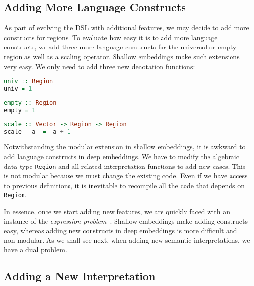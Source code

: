 \subsection{Adding More Language Constructs}

As part of evolving the DSL with additional features, we may decide to add more
constructs for regions. To evaluate how easy it is to add more language constructs,
we add three more
language constructs for the universal or empty region as well as a scaling
operator. Shallow embeddings make such extensions very easy. We only need
to add three new denotation functions:

\noindent
\begin{minipage}{0.25\textwidth}
\begin{lstlisting}[language=Haskell]
univ :: Region
univ = 1
\end{lstlisting}
\end{minipage}%
\begin{minipage}{0.25\textwidth}
\begin{lstlisting}[language=Haskell]
empty :: Region
empty = 1
\end{lstlisting}
\end{minipage}%
\begin{minipage}{0.5\textwidth}
\begin{lstlisting}[language=Haskell]
scale :: Vector -> Region -> Region
scale _ a  =  a + 1
\end{lstlisting}
\end{minipage}

\noindent
Notwithstanding the modular extension in shallow embeddings, it is awkward to
add language constructs in deep embeddings. We have to modify the algebraic data
type \lstinline{Region} and all related interpretation functions to add new
cases. This is not modular because we must change the existing code. Even if we
have access to previous definitions, it is inevitable to recompile all the code
that depends on \lstinline{Region}.

In essence, once we start adding new features, we are quickly faced with an
instance of the \emph{expression problem}~\citep{wadler1998expression}. Shallow
embeddings make adding constructs easy, whereas adding new constructs in deep
embeddings is more difficult and non-modular. As we shall see next, when adding
new semantic interpretations, we have a dual problem.

\subsection{Adding a New Interpretation} \label{sec:contains}

